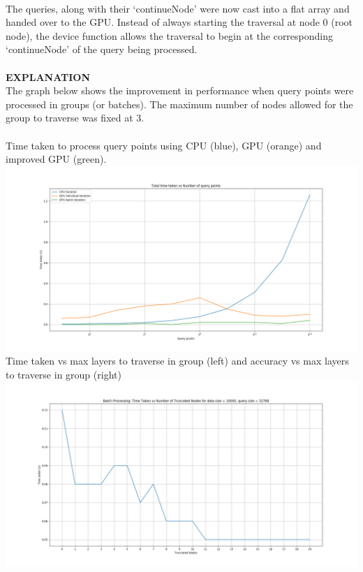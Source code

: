 \documentclass{article}
\begin{document}
\\
The queries, along with their ‘continueNode’ were now cast into a flat
array and handed over to the GPU. Instead of always starting the traversal at node 0 (root node), the device function allows the traversal to begin at the corresponding ‘continueNode’ of the query being processed.\\
\\
\large
\textbf{EXPLANATION}\\
\normalsize
\newline
The graph below shows the improvement in performance when query points were processed in groups (or batches). The maximum number of nodes allowed for the group to traverse was fixed at 3.\\
\\
Time taken to process query points using CPU (blue), GPU (orange) and improved GPU (green).\\
\includegraphics[scale=0.38]{../batchtree/graphs/cpu_gpu_batch}\\
Time taken vs max layers to traverse in group (left) and accuracy vs max layers to traverse in group (right)\\
\includegraphics[scale=0.18]{../batchtree/graphs/batch_time}
\end{document}
